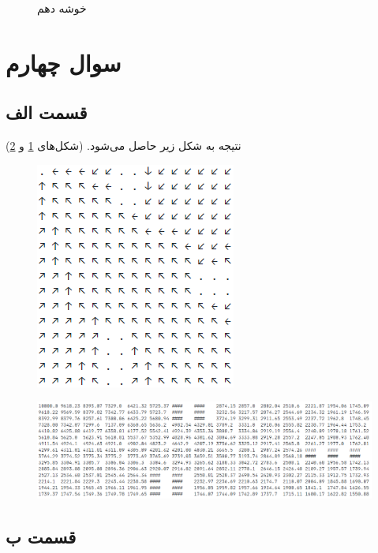 \documentclass[12pt, a4paper]{article}
\begin{document}
\begin{figure}[h]
\begin{subfigure}{0.3\linewidth}
    \end{subfigure}
    \caption{خوشه دهم}
\end{figure}

\clearpage

\section*{سوال چهارم}

\subsection*{قسمت الف}

نتیجه به شکل زیر حاصل می‌شود. (شکل‌های \ref{parta_policy} و \ref{parta_value})

\begin{figure}[h]
    \centering
    \includegraphics{images/q4/a/policy.png}
    \caption{}
    \label{parta_policy}
\end{figure}

\begin{figure}[h]
    \centering
    \includegraphics[width=0.8\linewidth]{images/q4/a/value.png}
    \caption{}
    \label{parta_value}
\end{figure}

\clearpage

\subsection*{قسمت ب}
\end{document}
